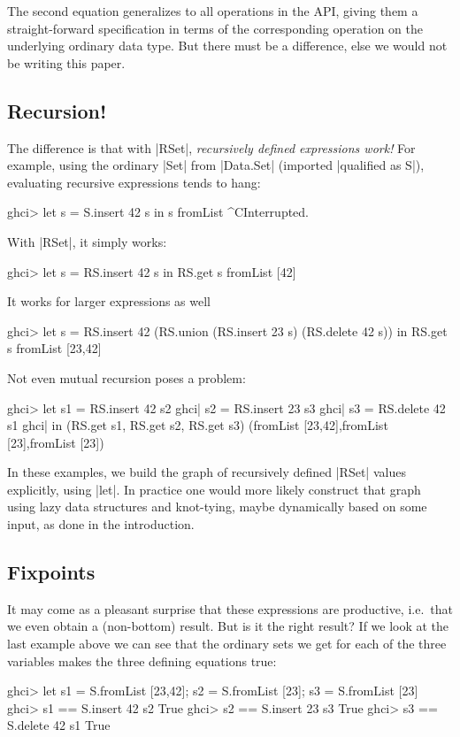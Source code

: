 \documentclass[manuscript,screen,acmsmall,nonacm]{acmart}
\begin{document}
The second equation generalizes to all operations in the API, giving them a straight-forward specification in terms of the corresponding operation on the underlying ordinary data type. But there must be a difference, else we would not be writing this paper.

\subsection{Recursion!}

The difference is that with |RSet|, \emph{recursively defined expressions work!} For example, using the ordinary |Set| from |Data.Set| (imported |qualified as S|), evaluating recursive expressions tends to hang:
\begin{code}
ghci> let s = S.insert 42 s in s
fromList ^CInterrupted.
\end{code}
With |RSet|, it simply works:
\begin{code}
ghci> let s = RS.insert 42 s in RS.get s
fromList [42]
\end{code}
It works for larger expressions as well
\begin{code}
ghci> let s = RS.insert 42 (RS.union (RS.insert 23 s) (RS.delete 42 s)) in RS.get s
fromList [23,42]
\end{code}
Not even mutual recursion poses a problem:
\begin{code}
ghci>  let  s1 = RS.insert 42 s2
ghci|       s2 = RS.insert 23 s3
ghci|       s3 = RS.delete 42 s1
ghci|  in (RS.get s1, RS.get s2, RS.get s3)
(fromList [23,42],fromList [23],fromList [23])
\end{code}

In these examples, we build the graph of recursively defined |RSet| values explicitly, using |let|. In practice one would more likely construct that graph using lazy data structures and knot-tying, maybe dynamically based on some input, as done in the introduction.

\subsection{Fixpoints}

It may come as a pleasant surprise that these expressions are productive, i.e.\ that we even obtain a (non-bottom) result. But is it the right result? If we look at the last example above we can see that the ordinary sets we get for each of the three variables makes the three defining equations true:
\begin{code}
ghci> let s1 = S.fromList [23,42]; s2 = S.fromList [23]; s3 = S.fromList [23]
ghci> s1 == S.insert 42 s2
True
ghci> s2 == S.insert 23 s3
True
ghci> s3 == S.delete 42 s1
True
\end{code}
\end{document}
